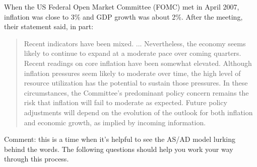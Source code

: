 \documentclass[letterpaper,12pt]{exam}
\begin{document}
\begin{questions}
When the US Federal Open Market Committee (FOMC) met in April 2007, 
inflation was close to 3\% and GDP growth was about 2\%.  
After the meeting, 
their statement said, in part: 
%
\begin{quote}
Recent indicators have been mixed. ...
Nevertheless, the economy seems likely to continue
to expand at a moderate pace over coming quarters.
%
Recent readings on core inflation have been somewhat elevated.
Although inflation pressures seem likely to moderate over time,
the high level of resource utilization has the potential
to sustain those pressures.
%
In these circumstances, the Committee's predominant policy concern remains the risk that inflation will fail to moderate as expected. Future policy adjustments will depend on the evolution of the outlook for both inflation and economic growth, as implied by incoming information.
\end{quote}
%
Comment:  this is a time when it's helpful to 
see the AS/AD model lurking behind the words.
The following questions should help you work your
way through this process.
%


\end{questions}
\end{document}
